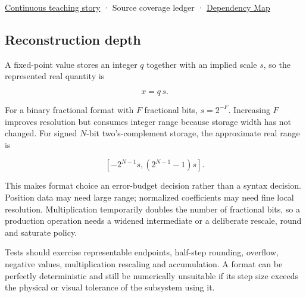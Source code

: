 \hyperref[01-foundations-i-ch001-choosing-what-information-to-keep]{Continuous teaching story} · {Source coverage ledger} · \hyperref[appendix-4ad47bdd269a]{Dependency Map}

\subsection{Reconstruction depth}\label{appendix-ceb4c4a9b5a1-reconstruction-depth}

A fixed-point value stores an integer \(q\) together with an implied scale \(s\), so the represented real quantity is

\[
x=q\,s.
\]

For a binary fractional format with \(F\) fractional bits, \(s=2^{-F}\). Increasing \(F\) improves resolution but consumes integer range because storage width has not changed. For signed \(N\)-bit two's-complement storage, the approximate real range is

\[
[-2^{N-1}s,(2^{N-1}-1)s].
\]

This makes format choice an error-budget decision rather than a syntax decision. Position data may need large range; normalized coefficients may need fine local resolution. Multiplication temporarily doubles the number of fractional bits, so a production operation needs a widened intermediate or a deliberate rescale, round and saturate policy.

Tests should exercise representable endpoints, half-step rounding, overflow, negative values, multiplication rescaling and accumulation. A format can be perfectly deterministic and still be numerically unsuitable if its step size exceeds the physical or visual tolerance of the subsystem using it.
